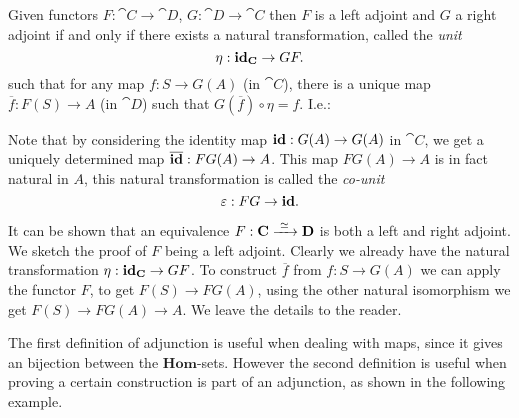 \begin{lemma}
	Given functors $F:\cat{C} \to \cat{D}$, $G: \cat{D} \to \cat{C}$ then $F$ is a left adjoint and $G$ a right adjoint if and only if there exists a natural transformation, called the \emph{unit}
	$$ \eta : \mathbf{id}_{\mathbf{C}} \to GF. $$
	such that for any map $f: S \to G(A)$ (in $\cat{C}$), there is a unique map $\overline{f}: F(S) \to A$ (in $\cat{D}$) such that $G(\overline{f}) \circ \eta = f$. I.e.:
\begin{center}
\end{center}
\end{lemma}

Note that by considering the identity map $\mathbf{id} : G(A) \to G(A)$ in $\cat{C}$, we get a uniquely determined map $\overline{\mathbf{id}}:FG(A) \to A$. This map $FG(A) \to A$ is in fact natural in $A$, this natural transformation is called the \emph{co-unit}
$$ \varepsilon: FG \to \mathbf{id}. $$

It can be shown that an equivalence $F: \mathbf{C} \xrightarrow{\,\,{\simeq}\,\,} \mathbf{D}$ is both a left and right adjoint. We sketch the proof of $F$ being a left adjoint. Clearly we already have the natural transformation $\eta: \mathbf{id}_{\mathbf{C}} \to GF$. To construct $\overline{f}$ from $f: S \to G(A)$ we can apply the functor $F$, to get $F(S) \to FG(A)$, using the other natural isomorphism we get $F(S) \to FG(A) \to A$. We leave the details to the reader.

The first definition of adjunction is useful when dealing with maps, since it gives an bijection between the $\mathbf{Hom}$-sets. However the second definition is useful when proving a certain construction is part of an adjunction, as shown in the following example.

